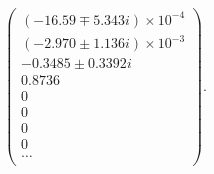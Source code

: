 \begin{equation}
\left(
\begin{array}{c}
(-16.59\mp 5.343 i)\times 10^{-4}\\
(-2.970\pm 1.136 i)\times 10^{-3}\\
-0.3485\pm 0.3392 i\\
0.8736\\
0\\
0\\
0\\
0\\
\ldots\\
\end{array}
\right).
\end{equation}

